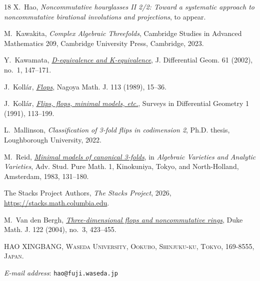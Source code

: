 \documentclass[a4paper,10pt]{article}
\theoremstyle{remark}
\theoremstyle{plain}
\begin{document}
\begin{thebibliography}{18}
 X.~Hao,
\emph{Noncommutative hourglasses II 2/2: Toward a systematic approach to
noncommutative birational involutions and projections}, to appear.

 M.~Kawakita,
\emph{Complex Algebraic Threefolds}, Cambridge Studies in Advanced
Mathematics 209, Cambridge University Press, Cambridge, 2023.

 Y.~Kawamata,
\href{https://doi.org/10.4310/jdg/1090351323}{\emph{D-equivalence and K-equivalence}},
J. Differential Geom. 61 (2002), no.~1, 147--171.

 J.~Koll\'ar,
\href{https://doi.org/10.1017/S0027763000001240}{\emph{Flops}},
Nagoya Math. J. 113 (1989), 15--36.

 J.~Koll\'ar,
\href{https://archive.intlpress.com/site/pub/files/_fulltext/journals/sdg/1990/0001/0001/SDG-1990-0001-0001-a003.pdf}{\emph{Flips, flops, minimal models, etc.}},
Surveys in Differential Geometry 1 (1991), 113--199.

 L.~Mallinson,
\emph{Classification of 3-fold flips in codimension 2},
Ph.D. thesis, Loughborough University, 2022.

 M.~Reid,
\href{https://doi.org/10.2969/aspm/00110131}{\emph{Minimal models of canonical 3-folds}},
in \emph{Algebraic Varieties and Analytic Varieties}, Adv. Stud. Pure Math. 1,
Kinokuniya, Tokyo, and North-Holland, Amsterdam, 1983, 131--180.

 The Stacks Project Authors,
\emph{The Stacks Project}, 2026,
\url{https://stacks.math.columbia.edu}.

 M.~Van den Bergh,
\href{https://doi.org/10.1215/S0012-7094-04-12231-6}{\emph{Three-dimensional flops and noncommutative rings}},
Duke Math. J. 122 (2004), no.~3, 423--455.
\end{thebibliography}

\bigskip
{\footnotesize
\noindent HAO XINGBANG, \textsc{Waseda University, Ookubo, Shinjuku-ku,
Tokyo, 169-8555, Japan.}\par\nopagebreak
\noindent\textit{E-mail address}: \texttt{hao@fuji.waseda.jp}\par
}
\end{document}
